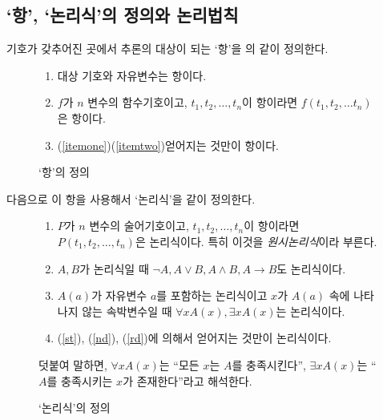 \documentclass[demo,chapter,openany,amsmath,gremph]{oblivoir}
\makeatletter
\newif\if@showcommand\@showcommandtrue
\newcommand\showcommand[1]{%
	\if@showcommand
	 \checkoddpage\ifoddpage
      \marginpar{\small\texttt{\textbackslash #1}}%
   \else
      \marginpar{\hfill\small\texttt{\textbackslash #1}}%
   \fi
	\fi
}
\makeatother
\begin{document}
\subsection{`항', `논리식'의 정의와 논리법칙}

기호가 갖추어진 곳에서 추론의 대상이 되는 `항'을 의
\과 같이 정의한다.\showcommand{pref}

\begin{figure}
\centering
\begin{minipage}{.75\textwidth}
\begin{enumerate}[(1)]\tightlist\small\raggedright
\item \label{itemone} 대상 기호와 자유변수는 항이다.
\item \label{itemtwo} $f$가 $n$ 변수의 함수기호이고, $t_1 , t_2 ,
  \ldots, t_n$이 항이라면 $f(t_1 , t_2 , \ldots t_n )$은 항이다.
\item (\ref{itemone})\와 (\ref{itemtwo}) 얻어지는 것만이 항이다.
\end{enumerate}
\end{minipage}
\caption{`항'의 정의}\label{fig:term}
\end{figure}

다음으로 이 항을 사용해서 `논리식'을 \과 같이 정의한다.

\begin{figure}
\centering
\begin{minipage}{.85\textwidth}
\begin{enumerate}[(1)]\tightlist\small\raggedright
\item \label{st} $P$가 $n$ 변수의 술어기호이고, $t_1 , t_2 , \ldots ,
  t_n $이 항이라면 $P(t_1 , t_2 , \ldots , t_n )$은 논리식이다. 특히
  이것을 \emph{원시논리식}이라 부른다.
\item \label{nd} $A, B$가 논리식일 때 $\lnot A, A \lor B, A \land B, A
  \to B$도 논리식이다.
\item \label{rd} $A(a)$가 자유변수 $a$를 포함하는 논리식이고 $x$가
  $A(a)$ 속에 나타나지 않는 속박변수일 때 $\forall xA(x), \exists
  xA(x)$는 논리식이다.
\item (\ref{st}), (\ref{nd}), (\ref{rd})에 의해서 얻어지는 것만이
  논리식이다.
\end{enumerate}
\small
덧붙여 말하면, $\forall xA(x)$는 ``모든 $x$는 $A$를 충족시킨다'',
$\exists xA(x)$는 ``$A$를 충족시키는 $x$가 존재한다''라고 해석한다.
\end{minipage}
\caption{`논리식'의 정의}\label{fig:logi}
\end{figure}
\end{document}
